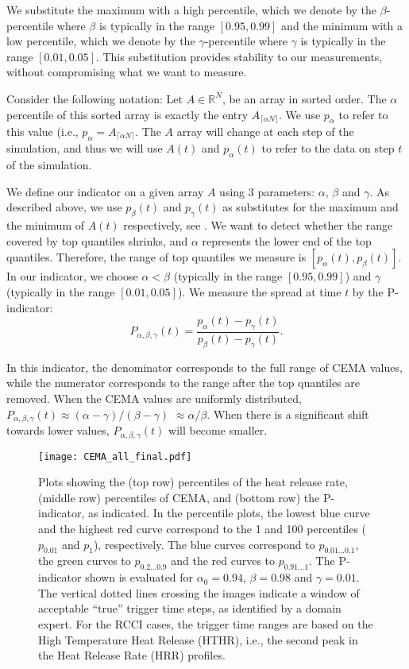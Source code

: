 \documentclass[final]{siamltex}
\newcommand{\RR}{\mathbb{R}}
\newcommand{\pmetric}{P}
\newcommand{\pt}{{p}}
\newcommand{\be}{\begin{equation}}
\newcommand{\ee}{\end{equation}}
\begin{document}
We substitute the maximum with a high percentile, which we denote by the 
$\beta$-percentile where $\beta $ is typically in the range $[0.95,0.99]$ and the 
minimum with a low percentile, which we denote by the $\gamma$-percentile where 
$\gamma$ is typically in the range $[0.01,0.05]$. This substitution provides  
stability to our measurements,  without compromising what we want to measure. 
 
Consider the following notation: Let $A \in \RR^N$, be an array in sorted order.
The $\alpha$ percentile of this sorted array is exactly the entry $A_{\lceil \alpha N \rceil}$. 
We use $\pt_\alpha$ to refer to this value (i.e.,  $\pt_\alpha = A_{\lceil \alpha N \rceil}$.  
The $A$ array  will change at each step of  the simulation, and thus we will use $A(t)$ and  
$\pt_\alpha(t)$ to refer to the data  on step $t$ of the simulation. 

We define our indicator on a given array $A$ using 3 parameters: $\alpha$,
$\beta$ and $\gamma$.  As described above, we use $\pt_\beta(t)$ and
$\pt_\gamma(t)$ as substitutes for the maximum and the minimum of $A(t)$
respectively, see . We  want to detect whether the range
covered by top quantiles shrinks, and $\alpha$ represents the lower end of the
top quantiles. Therefore, the  range of top quantiles we  measure is
$\left[\pt_\alpha(t), \pt_\beta(t)\right]$.  In our indicator, we choose $\alpha
< \beta$ (typically in the range $[0.95,0.99]$) and $\gamma$ (typically in the
range $[0.01,0.05]$). We measure the spread at time $t$ by the
\pmetric-indicator:
\be
\pmetric_{\alpha,\beta,\gamma}(t) = \frac{\pt_\alpha(t) - \pt_\gamma(t)}{\pt_\beta(t) - \pt_\gamma(t)}.
\label{eq:pmetric}
\ee

\noindent In this indicator,  the denominator corresponds to the full range of CEMA values,  while  the 
numerator  corresponds to the  range  after the  top quantiles are removed.
 When the CEMA values are uniformly distributed, 
 $\pmetric_{\alpha,\beta,\gamma}(t) \approx (\alpha - \gamma)/(\beta - \gamma)$  $\approx \alpha/\beta$.
When there is a significant shift towards lower values, $\pmetric_{\alpha,\beta,\gamma}(t)$ will become smaller.

\begin{figure}[H]
\centering
\texttt{[image: CEMA\_all\_final.pdf]}
\caption{\label{fig:CEMA} Plots showing the (top row) percentiles of the
heat release rate, (middle row) percentiles of CEMA, and (bottom row) the
\pmetric-indicator, as indicated. In the percentile plots, the lowest
blue curve and the highest red curve correspond to the 1 and
100 percentiles ($p_{0.01}$ and $p_{1}$), respectively. The blue curves
correspond to $p_{0.01 \ldots 0.1}$, the green curves to $p_{0.2 \ldots 0.9}$
and the red curves to $p_{0.91 \ldots 1}$. The \pmetric-indicator shown is
evaluated for $\alpha_0=0.94$, $\beta=0.98$ and $\gamma=0.01$.
The vertical dotted lines crossing the images indicate a window of
acceptable ``true'' trigger time steps, as identified by a domain expert.
For the RCCI cases, the trigger time ranges are based on the High Temperature
Heat Release (HTHR), i.e., the second peak in the Heat Release Rate (HRR) profiles. }
\end{figure}
\end{document}
